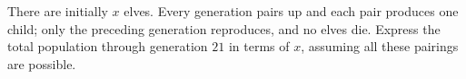 There are initially $x$ elves. Every generation pairs up and each pair produces one child; only the preceding generation reproduces, and no elves die. Express the total population through generation $21$ in terms of $x$, assuming all these pairings are possible.
